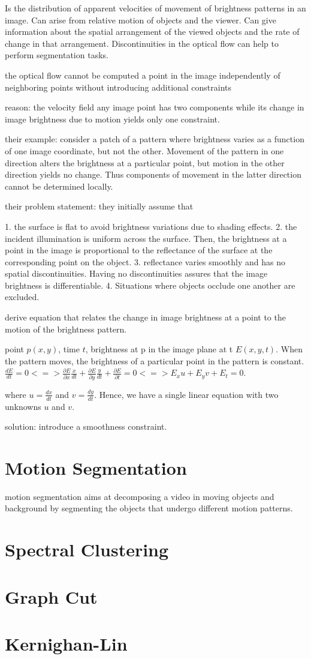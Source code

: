 Is the distribution of apparent velocities of movement of brightness patterns in an image.
Can arise from relative motion of objects and the viewer.
Can give information about the spatial arrangement of the viewed objects and the rate of change in that arrangement.
Discontinuities in the optical flow can help to perform segmentation tasks.

the optical flow cannot be computed a point in the image independently of neighboring points without introducing additional constraints

reason: the velocity field any image point has two components while its change in image brightness due to motion yields only one constraint.

their example: consider a patch of a pattern where brightness varies as a function of one image coordinate, but not the other. Movement of the pattern in one direction alters the brightness at a particular point, but motion in the other direction yields no change. Thus components of movement in the latter direction cannot be determined locally.

their problem statement:
they initially assume that 

1. the surface is flat to avoid brightness variations due to shading effects.
2. the incident illumination is uniform across the surface. Then, the brightness at a point in the image is proportional to the reflectance of the surface at the corresponding point on the object.
3. reflectance varies smoothly and has no spatial discontinuities. Having no discontinuities assures that the image brightness is differentiable.
4. Situations where objects occlude one another are excluded.

derive equation that relates the change in image brightness at a point to the motion of the brightness pattern.

point $p(x,y)$, time $t$, brightness at p in the image plane at t $E(x,y,t)$.
When the pattern moves, the brightness of a particular point in the pattern is constant. 
$\frac{d E}{dt} = 0 <=> \frac{\partial E}{\partial x} \frac{x}{dt} + \frac{\partial E}{\partial y} \frac{y}{dt} + \frac{\partial E}{\partial t} = 0 <=> E_{x} u + E_{y} v + E_{t} = 0$.

where $u = \frac{dx}{dt}$ and $v = \frac{dy}{dt}$. Hence, we have a single linear equation with two unknowns $u$ and $v$.

solution: introduce a smoothness constraint.


\section{Motion Segmentation}
motion segmentation aims at decomposing a video in moving objects and background by segmenting the objects that undergo different motion patterns.
\section{Spectral Clustering}
\section{Graph Cut}
\section{Kernighan-Lin}
